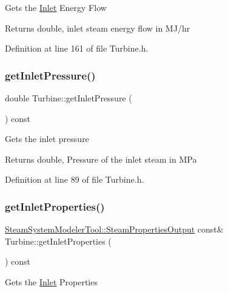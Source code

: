 Gets the \hyperlink{class_inlet}{Inlet} Energy Flow

\begin{DoxyReturn}{Returns}
double, inlet steam energy flow in M\+J/hr 
\end{DoxyReturn}


Definition at line 161 of file Turbine.\+h.

\mbox{\label{class_turbine_a148ad3877851f1c3931d8a6771d750c5}} 
\subsubsection{\texorpdfstring{get\+Inlet\+Pressure()}{getInletPressure()}}
{\footnotesize\ttfamily double Turbine\+::get\+Inlet\+Pressure (\begin{DoxyParamCaption}{ }\end{DoxyParamCaption}) const\hspace{0.3cm}{\ttfamily [inline]}}

Gets the inlet pressure

\begin{DoxyReturn}{Returns}
double, Pressure of the inlet steam in M\+Pa 
\end{DoxyReturn}


Definition at line 89 of file Turbine.\+h.

\mbox{\label{class_turbine_a7a906cf74affed9acfa4045964eccbf6}} 
\subsubsection{\texorpdfstring{get\+Inlet\+Properties()}{getInletProperties()}}
{\footnotesize\ttfamily \hyperlink{struct_steam_system_modeler_tool_1_1_steam_properties_output}{Steam\+System\+Modeler\+Tool\+::\+Steam\+Properties\+Output} const\& Turbine\+::get\+Inlet\+Properties (\begin{DoxyParamCaption}{ }\end{DoxyParamCaption}) const\hspace{0.3cm}{\ttfamily [inline]}}

Gets the \hyperlink{class_inlet}{Inlet} Properties

